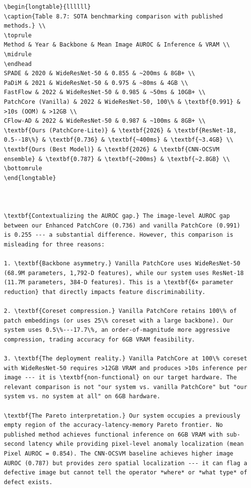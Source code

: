 \documentclass[12pt,a4paper,oneside]{report}
\begin{document}
\begin{verbatim}
\begin{longtable}{llllll}
\caption{Table 8.7: SOTA benchmarking comparison with published methods.} \\
\toprule
Method & Year & Backbone & Mean Image AUROC & Inference & VRAM \\
\midrule
\endhead
SPADE & 2020 & WideResNet-50 & 0.855 & ~200ms & 8GB+ \\
PaDiM & 2021 & WideResNet-50 & 0.975 & ~80ms & 4GB \\
FastFlow & 2022 & WideResNet-50 & 0.985 & ~50ms & 10GB+ \\
PatchCore (Vanilla) & 2022 & WideResNet-50, 100\% & \textbf{0.991} & >10s (OOM) & >12GB \\
CFlow-AD & 2022 & WideResNet-50 & 0.987 & ~100ms & 8GB+ \\
\textbf{Ours (PatchCore-Lite)} & \textbf{2026} & \textbf{ResNet-18, 0.5--18\%} & \textbf{0.736} & \textbf{~400ms} & \textbf{~3.4GB} \\
\textbf{Ours (Best Model)} & \textbf{2026} & \textbf{CNN-OCSVM ensemble} & \textbf{0.787} & \textbf{~200ms} & \textbf{~2.8GB} \\
\bottomrule
\end{longtable}



\textbf{Contextualizing the AUROC gap.} The image-level AUROC gap between our Enhanced PatchCore (0.736) and vanilla PatchCore (0.991) is 0.255 --- a substantial difference. However, this comparison is misleading for three reasons:

1. \textbf{Backbone asymmetry.} Vanilla PatchCore uses WideResNet-50 (68.9M parameters, 1,792-D features), while our system uses ResNet-18 (11.7M parameters, 384-D features). This is a \textbf{6× parameter reduction} that directly impacts feature discriminability.

2. \textbf{Coreset compression.} Vanilla PatchCore retains 100\% of patch embeddings (or uses 25\% coreset with a large backbone). Our system uses 0.5\%---17.7\%, an order-of-magnitude more aggressive compression, trading accuracy for 6GB VRAM feasibility.

3. \textbf{The deployment reality.} Vanilla PatchCore at 100\% coreset with WideResNet-50 requires >12GB VRAM and produces >10s inference per image --- it is \textbf{non-functional} on our target hardware. The relevant comparison is not "our system vs. vanilla PatchCore" but "our system vs. no system at all" on 6GB hardware.

\textbf{The Pareto interpretation.} Our system occupies a previously empty region of the accuracy-latency-memory Pareto frontier. No published method achieves functional inference on 6GB VRAM with sub-second latency while providing pixel-level anomaly localization (mean Pixel AUROC = 0.854). The CNN-OCSVM baseline achieves higher image AUROC (0.787) but provides zero spatial localization --- it can flag a defective image but cannot tell the operator *where* or *what type* of defect exists.



\end{verbatim}
\end{document}
